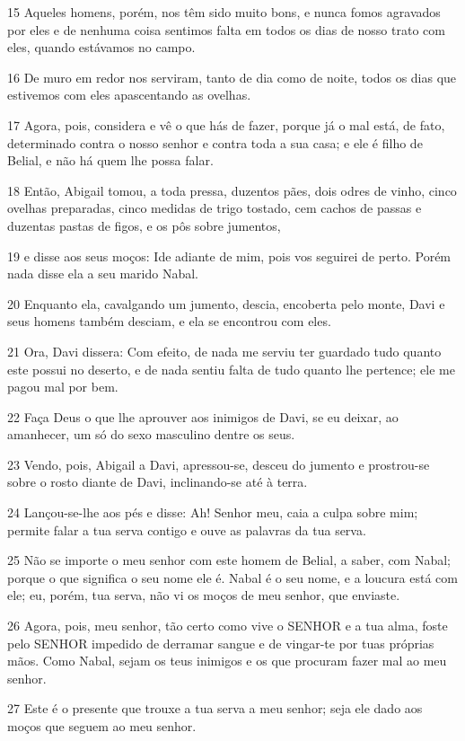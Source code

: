 \par 15 Aqueles homens, porém, nos têm sido muito bons, e nunca fomos agravados por eles e de nenhuma coisa sentimos falta em todos os dias de nosso trato com eles, quando estávamos no campo.
\par 16 De muro em redor nos serviram, tanto de dia como de noite, todos os dias que estivemos com eles apascentando as ovelhas.
\par 17 Agora, pois, considera e vê o que hás de fazer, porque já o mal está, de fato, determinado contra o nosso senhor e contra toda a sua casa; e ele é filho de Belial, e não há quem lhe possa falar.
\par 18 Então, Abigail tomou, a toda pressa, duzentos pães, dois odres de vinho, cinco ovelhas preparadas, cinco medidas de trigo tostado, cem cachos de passas e duzentas pastas de figos, e os pôs sobre jumentos,
\par 19 e disse aos seus moços: Ide adiante de mim, pois vos seguirei de perto. Porém nada disse ela a seu marido Nabal.
\par 20 Enquanto ela, cavalgando um jumento, descia, encoberta pelo monte, Davi e seus homens também desciam, e ela se encontrou com eles.
\par 21 Ora, Davi dissera: Com efeito, de nada me serviu ter guardado tudo quanto este possui no deserto, e de nada sentiu falta de tudo quanto lhe pertence; ele me pagou mal por bem.
\par 22 Faça Deus o que lhe aprouver aos inimigos de Davi, se eu deixar, ao amanhecer, um só do sexo masculino dentre os seus.
\par 23 Vendo, pois, Abigail a Davi, apressou-se, desceu do jumento e prostrou-se sobre o rosto diante de Davi, inclinando-se até à terra.
\par 24 Lançou-se-lhe aos pés e disse: Ah! Senhor meu, caia a culpa sobre mim; permite falar a tua serva contigo e ouve as palavras da tua serva.
\par 25 Não se importe o meu senhor com este homem de Belial, a saber, com Nabal; porque o que significa o seu nome ele é. Nabal é o seu nome, e a loucura está com ele; eu, porém, tua serva, não vi os moços de meu senhor, que enviaste.
\par 26 Agora, pois, meu senhor, tão certo como vive o SENHOR e a tua alma, foste pelo SENHOR impedido de derramar sangue e de vingar-te por tuas próprias mãos. Como Nabal, sejam os teus inimigos e os que procuram fazer mal ao meu senhor.
\par 27 Este é o presente que trouxe a tua serva a meu senhor; seja ele dado aos moços que seguem ao meu senhor.
